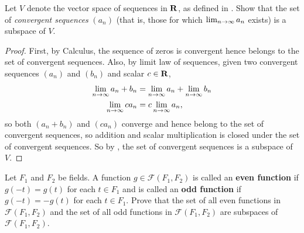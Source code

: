 \begin{exercise} \label{exercise 1.3.21}
Let \(V\) denote the vector space of sequences in \(\mathbf{R}\), as defined in .
Show that the set of \emph{convergent sequences} \((a_n)\) (that is, those for which \(\lim_{n \to \infty} a_n\) exists) is a subspace of \(V\).
\end{exercise}

\begin{proof}
First, by Calculus, the sequence of zeros is convergent hence belongs to the set of convergent sequences.
Also, by limit law of sequences, given two convergent sequences \((a_n)\) and \((b_n)\) and scalar \(c \in \mathbf{R}\),
\begin{align*}
    \lim_{n \to \infty} a_n + b_n & = \lim_{n \to \infty} a_n + \lim_{n \to \infty} b_n \\
    \lim_{n \to \infty} c a_n & = c \lim_{n \to \infty} a_n,
\end{align*}
so both \((a_n + b_n)\) and \((c a_n)\) converge and hence belong to the set of convergent sequences, so addition and scalar multiplication is closed under the set of convergent sequences.
So by , the set of convergent sequences is a subspace of \(V\).
\end{proof}

\begin{exercise} \label{exercise 1.3.22}
Let \(F_1\) and \(F_2\) be fields.
A function \(g \in \mathcal{F}(F_1, F_2)\) is called an \textbf{even function} if \(g(-t) = g(t)\) for each \(t \in F_1\)
and is called an \textbf{odd function} if \(g(-t) = -g(t)\) for each \(t \in F_1\).
Prove that the set of all even functions in \(\mathcal{F}(F_1, F_2)\) and the set of all odd functions in \(\mathcal{F}(F_1, F_2)\) are subspaces of \(\mathcal{F}(F_1, F_2)\).
\end{exercise}

